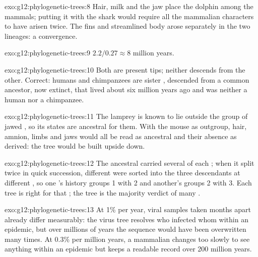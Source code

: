 \begin{solution}{exo:g12:phylogenetic-trees:8}
Hair, milk and the jaw place the dolphin among the mammals; putting it
with the shark would require all the mammalian characters to have
arisen twice. The fins and streamlined body arose separately in the
two lineages: a convergence.
\end{solution}

\begin{solution}{exo:g12:phylogenetic-trees:9}
$2.2/0.27 \approx 8$ million years.
\end{solution}

\begin{solution}{exo:g12:phylogenetic-trees:10}
Both are present tips; neither descends from the other. Correct:
humans and chimpanzees are sister , descended from a common
ancestor, now extinct, that lived about six million years ago and was
neither a human nor a chimpanzee.
\end{solution}

\begin{solution}{exo:g12:phylogenetic-trees:11}
The lamprey is known to lie outside the group of jawed ,
so its states are ancestral for them. With the mouse as outgroup,
hair, amnion, limbs and jaws would all be read as ancestral and their
absence as derived: the tree would be built upside down.
\end{solution}

\begin{solution}{exo:g12:phylogenetic-trees:12}
The ancestral  carried several  of each ; when
it split twice in quick succession, different  were sorted
into the three descendants at different , so one 's history
groups  1 with 2 and another's groups 2 with 3. Each  tree
is right for that ; the  tree is the majority verdict of
many .
\end{solution}

\begin{solution}{exo:g12:phylogenetic-trees:13}
At 1\% per year, viral samples taken months apart already differ
measurably: the virus tree resolves who infected whom within an
epidemic, but over millions of years the sequence would have been
overwritten many times. At 0.3\% per million years, a mammalian 
changes too slowly to see anything within an epidemic but keeps a
readable record over 200 million years.
\end{solution}

